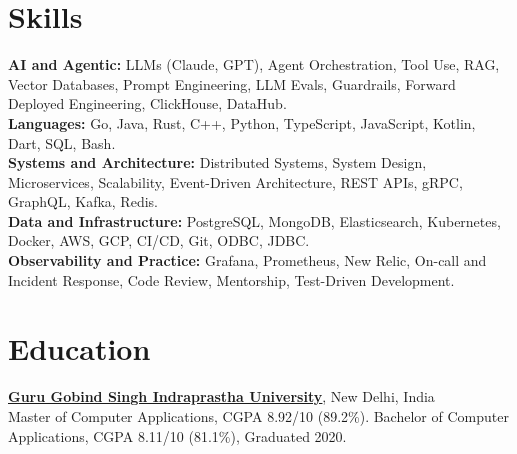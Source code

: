 \documentclass[11pt,letterpaper]{article}
\let\oldhref\href
\renewcommand{\href}[2]{\oldhref{#1}{\uline{#2}}}
\begin{document}
\section{Skills}
\textbf{AI and Agentic:} LLMs (Claude, GPT), Agent Orchestration, Tool Use, RAG, Vector Databases, Prompt Engineering, LLM Evals, Guardrails, Forward Deployed Engineering, ClickHouse, DataHub.\\
\textbf{Languages:} Go, Java, Rust, C++, Python, TypeScript, JavaScript, Kotlin, Dart, SQL, Bash.\\
\textbf{Systems and Architecture:} Distributed Systems, System Design, Microservices, Scalability, Event-Driven Architecture, REST APIs, gRPC, GraphQL, Kafka, Redis.\\
\textbf{Data and Infrastructure:} PostgreSQL, MongoDB, Elasticsearch, Kubernetes, Docker, AWS, GCP, CI/CD, Git, ODBC, JDBC.\\
\textbf{Observability and Practice:} Grafana, Prometheus, New Relic, On-call and Incident Response, Code Review, Mentorship, Test-Driven Development.

\section{Education}
\textbf{\href{http://ipu.ac.in/}{Guru Gobind Singh Indraprastha University}}, New Delhi, India\\
Master of Computer Applications, CGPA 8.92/10 (89.2\%). \quad
Bachelor of Computer Applications, CGPA 8.11/10 (81.1\%), Graduated 2020.
\end{document}
